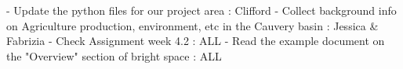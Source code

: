 - Update the python files for our project area : Clifford
- Collect background info on Agriculture production, environment, etc in the Cauvery basin : Jessica & Fabrizia
- Check Assignment week 4.2  : ALL
- Read the example document on the "Overview" section of bright space : ALL


